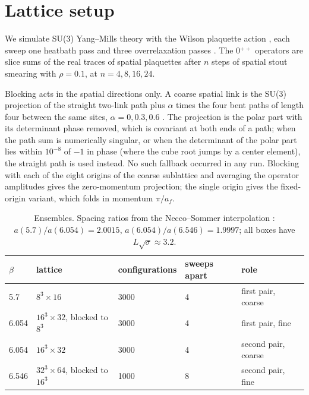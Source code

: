 \documentclass[11pt]{article}
\begin{document}
\section{Lattice setup}\label{sec:setup}

We simulate SU(3) Yang--Mills theory with the Wilson plaquette action \cite{Wilson1974}, each sweep one
heatbath pass \cite{Creutz1980,CabibboMarinari1982,KennedyPendleton1985} and three overrelaxation passes
\cite{BrownWoch1987}. The 0$^{++}$ operators are slice sums of the real traces of spatial plaquettes after
$n$ steps of spatial stout smearing \cite{MorningstarPeardon2004} with $\rho=0.1$, at $n=4,8,16,24$.

Blocking acts in the spatial directions only. A coarse spatial link is the SU(3) projection of the
straight two-link path plus $\alpha$ times the four bent paths of length four between the same sites,
$\alpha=0,0.3,0.6$ \cite{Teper1987}. The projection is the polar part with its determinant phase removed,
which is covariant at both ends of a path; when the path sum is numerically singular, or when the
determinant of the polar part lies within $10^{-8}$ of $-1$ in phase (where the cube root jumps by a
center element), the straight path is used instead. No such fallback occurred in any run. Blocking with
each of the eight origins of the coarse sublattice and averaging the operator amplitudes gives the
zero-momentum projection; the single origin gives the fixed-origin variant, which folds in momentum
$\pi/a_f$.

\begin{table}[t]
\centering
\begin{tabular}{@{}lllll@{}}
\toprule
$\beta$ & lattice & configurations & sweeps apart & role \\
\midrule
5.7 & $8^3\times16$ & 3000 & 4 & first pair, coarse \\
6.054 & $16^3\times32$, blocked to $8^3$ & 3000 & 4 & first pair, fine \\
6.054 & $16^3\times32$ & 3000 & 4 & second pair, coarse \\
6.546 & $32^3\times64$, blocked to $16^3$ & 1000 & 8 & second pair, fine \\
\bottomrule
\end{tabular}
\caption{Ensembles. Spacing ratios from the Necco--Sommer interpolation \cite{NeccoSommer2002}:
$a(5.7)/a(6.054)=2.0015$, $a(6.054)/a(6.546)=1.9997$; all boxes have $L\sqrt\sigma\approx3.2$.}
\label{tab:ensembles}
\end{table}
\end{document}

